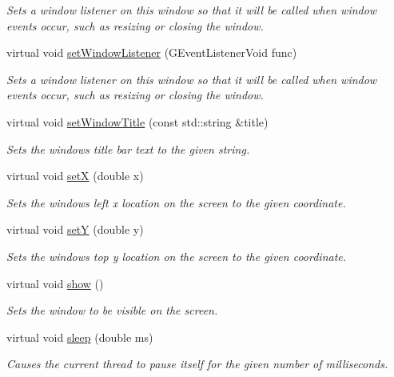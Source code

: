 \begin{DoxyCompactItemize}
\begin{DoxyCompactList}\small\item\em Sets a window listener on this window so that it will be called when window events occur, such as resizing or closing the window. \end{DoxyCompactList}\item 
virtual void \mbox{\hyperlink{classGWindow_a58b90463b205519917d5f68bdf068815}{set\+Window\+Listener}} (G\+Event\+Listener\+Void func)
\begin{DoxyCompactList}\small\item\em Sets a window listener on this window so that it will be called when window events occur, such as resizing or closing the window. \end{DoxyCompactList}\item 
virtual void \mbox{\hyperlink{classGWindow_a1c06b2b64d56394d6d77aa5b627910e2}{set\+Window\+Title}} (const std\+::string \&title)
\begin{DoxyCompactList}\small\item\em Sets the window\textquotesingle{}s title bar text to the given string. \end{DoxyCompactList}\item 
virtual void \mbox{\hyperlink{classGWindow_a9c18fcc579333bf9653d13ad2b372e39}{setX}} (double x)
\begin{DoxyCompactList}\small\item\em Sets the window\textquotesingle{}s left x location on the screen to the given coordinate. \end{DoxyCompactList}\item 
virtual void \mbox{\hyperlink{classGWindow_a7d57e2a5c35d27feb58fd498a3cf82b9}{setY}} (double y)
\begin{DoxyCompactList}\small\item\em Sets the window\textquotesingle{}s top y location on the screen to the given coordinate. \end{DoxyCompactList}\item 
virtual void \mbox{\hyperlink{classGWindow_a4b148f40a95444d5669406b918ad2f52}{show}} ()
\begin{DoxyCompactList}\small\item\em Sets the window to be visible on the screen. \end{DoxyCompactList}\item 
virtual void \mbox{\hyperlink{classGWindow_aa3381590c1ef33c08000c2fbb2bf0dd0}{sleep}} (double ms)
\begin{DoxyCompactList}\small\item\em Causes the current thread to pause itself for the given number of milliseconds. \end{DoxyCompactList}\item 

\end{DoxyCompactItemize}
